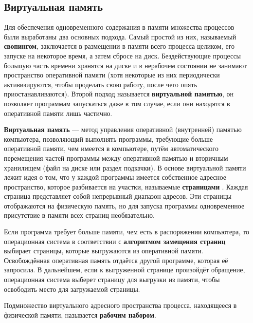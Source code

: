 \clearpage
\subsection{Виртуальная память}

Для обеспечения одновременного содержания в памяти множества процессов были выработаны два основных подхода. Самый простой из них, называемый \textbf{свопингом}, заключается в размещении в памяти всего процесса целиком, его запуске на некоторое время, а затем сбросе на диск. Бездействующие процессы большую часть времени хранятся на диске и в нерабочем состоянии не занимают пространство оперативной памяти (хотя некоторые из них периодически активизируются, чтобы проделать свою работу, после чего опять приостанавливаются). Второй подход называется \textbf{виртуальной памятью}, он позволяет программам запускаться даже в том случае, если они находятся в оперативной памяти лишь частично.

\textbf{Виртуальная память} --- метод управления оперативной (внутренней) памятью компьютера, позволяющий выполнять программы, требующие больше оперативной памяти, чем имеется в компьютере, путём автоматического перемещения частей программы между оперативной памятью и вторичным хранилищем (файл на диске или раздел подкачки). В основе виртуальной памяти лежит идея о том, что у каждой программы имеется собственное адресное пространство, которое разбивается на участки, называемые \textbf{страницами} \cite{tannenbaum}. Каждая страница представляет собой непрерывный диапазон адресов. Эти страницы отображаются на физическую память, но для запуска программы одновременное присутствие в памяти всех страниц необязательно.

Если программа требует больше памяти, чем есть в распоряжении компьютера, то операционная система в соответствии с \textbf{алгоритмом замещения страниц} \cite{tannenbaum} выбирает страницы, которые выгружаются из оперативной памяти. Освобождённая оперативная память отдаётся другой программе, которая её запросила. В дальнейшем, если к выгруженной странице произойдёт обращение, операционная система выберет страницу для выгрузки из памяти, чтобы освободить место для загружаемой страницы.

Подмножество виртуального адресного пространства процесса, находящееся в физической памяти, называется \textbf{рабочим набором}. \cite{windows}


